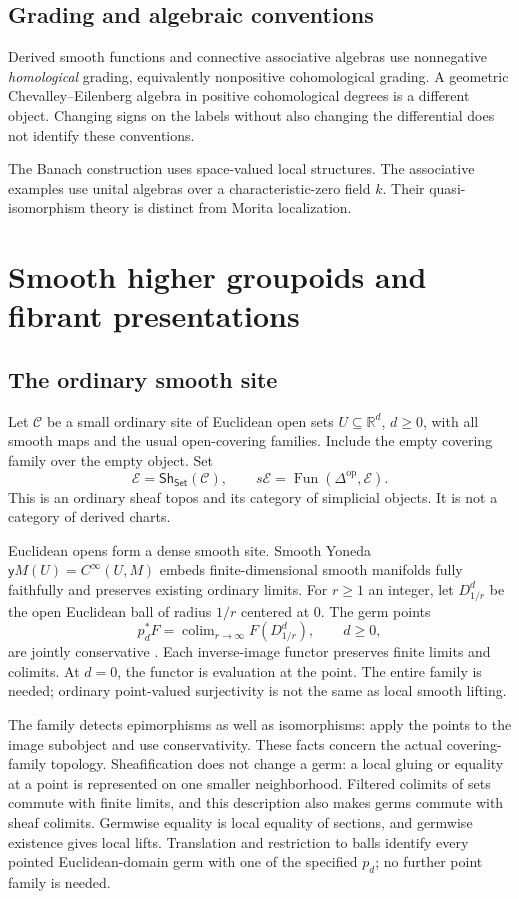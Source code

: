 \documentclass[12pt]{amsart}
\theoremstyle{definition}
\theoremstyle{remark}
\numberwithin{equation}{section}
\newcommand{\R}{\mathbb R}
\newcommand{\CC}{\mathcal C}
\newcommand{\E}{\mathcal E}
\newcommand{\Sh}{\mathsf{Sh}}
\newcommand{\Set}{\mathsf{Set}}
\newcommand{\y}{\mathsf y}
\newcommand{\op}{\mathrm{op}}
\DeclareMathOperator{\Fun}{Fun}
\DeclareMathOperator*{\colim}{colim}
\begin{document}
\subsection{Grading and algebraic conventions}

Derived smooth functions and connective associative
algebras use nonnegative \emph{homological} grading,
equivalently nonpositive cohomological grading.
A geometric Chevalley--Eilenberg algebra in positive
cohomological degrees is a different object.
Changing signs on the labels without also changing
the differential does not identify these conventions.

The Banach construction uses space-valued local structures.
The associative examples use unital algebras over a
characteristic-zero field $k$. Their quasi-isomorphism
theory is distinct from Morita localization.

\section{Smooth higher groupoids and fibrant presentations}
\label{sec:groupoids}

\subsection{The ordinary smooth site}

Let $\CC$ be a small ordinary site of Euclidean open sets
$U\subseteq\R^d$, $d\ge0$, with all smooth maps and the usual
open-covering families. Include the empty covering family
over the empty object. Set
\[
 \E=\Sh_{\Set}(\CC),\qquad
 s\E=\Fun(\Delta^\op,\E).
\]
This is an ordinary sheaf topos and its category of simplicial
objects. It is not a category of derived charts.

Euclidean opens form a dense smooth site. Smooth Yoneda
$\y M(U)=C^\infty(U,M)$ embeds finite-dimensional smooth
manifolds fully faithfully and preserves existing ordinary
limits. For $r\ge1$ an integer, let $D^d_{1/r}$ be the open
Euclidean ball of radius $1/r$ centered at $0$. The germ points
\[
 p_d^*F=\colim_{r\to\infty}F(D^d_{1/r}),\qquad d\ge0,
\]
are jointly conservative
\cite[Proposition~4.12 and Lemma~4.13, p.~44]{NSS2015}.
Each inverse-image functor preserves finite limits and
colimits. At $d=0$, the functor is evaluation at the point.
The entire family is needed; ordinary point-valued
surjectivity is not the same as local smooth lifting.

The family detects epimorphisms as well as isomorphisms:
apply the points to the image subobject and use
conservativity.
These facts concern the actual covering-family topology.
Sheafification does not change a germ: a local gluing or
equality at a point is represented on one smaller neighborhood.
Filtered colimits of sets commute with finite limits, and this
description also makes germs commute with sheaf colimits.
Germwise equality is local equality of sections, and germwise
existence gives local lifts. Translation and restriction to
balls identify every pointed Euclidean-domain germ with one
of the specified $p_d$; no further point family is needed.
\end{document}
